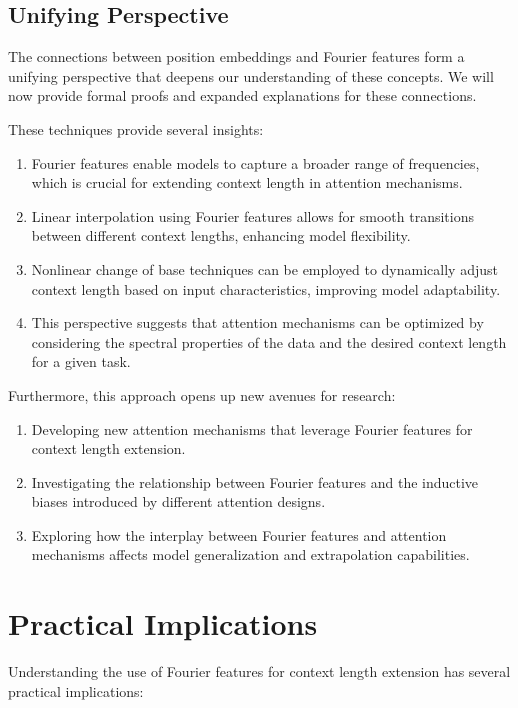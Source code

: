 \documentclass{article}
\begin{document}
\subsection{Unifying Perspective}

The connections between position embeddings and Fourier features form a unifying perspective that deepens our understanding of these concepts. We will now provide formal proofs and expanded explanations for these connections.

These techniques provide several insights:

\begin{enumerate}
    \item Fourier features enable models to capture a broader range of frequencies, which is crucial for extending context length in attention mechanisms.
    \item Linear interpolation using Fourier features allows for smooth transitions between different context lengths, enhancing model flexibility.
    \item Nonlinear change of base techniques can be employed to dynamically adjust context length based on input characteristics, improving model adaptability.
    \item This perspective suggests that attention mechanisms can be optimized by considering the spectral properties of the data and the desired context length for a given task.
\end{enumerate}

Furthermore, this approach opens up new avenues for research:

\begin{enumerate}
    \item Developing new attention mechanisms that leverage Fourier features for context length extension.
    \item Investigating the relationship between Fourier features and the inductive biases introduced by different attention designs.
    \item Exploring how the interplay between Fourier features and attention mechanisms affects model generalization and extrapolation capabilities.
\end{enumerate}

\section{Practical Implications}

Understanding the use of Fourier features for context length extension has several practical implications:
\end{document}
